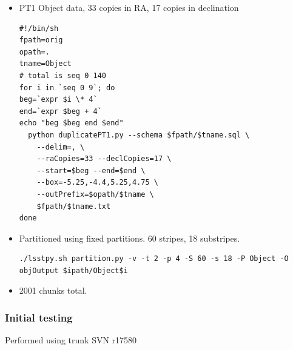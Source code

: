 \documentclass[DM,toc]{lsstdoc}
\begin{document}
\begin{itemize}
\item
  PT1 Object data, 33 copies in RA, 17 copies in declination

\begin{verbatim}
#!/bin/sh
fpath=orig
opath=.
tname=Object
# total is seq 0 140
for i in `seq 0 9`; do
beg=`expr $i \* 4`
end=`expr $beg + 4`
echo "beg $beg end $end"
  python duplicatePT1.py --schema $fpath/$tname.sql \
    --delim=, \
    --raCopies=33 --declCopies=17 \
    --start=$beg --end=$end \
    --box=-5.25,-4.4,5.25,4.75 \
    --outPrefix=$opath/$tname \
    $fpath/$tname.txt
done
\end{verbatim}

\item
  Partitioned using fixed partitions. 60 stripes, 18 substripes.

\begin{verbatim}
./lsstpy.sh partition.py -v -t 2 -p 4 -S 60 -s 18 -P Object -O objOutput $ipath/Object$i
\end{verbatim}

\item
  2001 chunks total.
\end{itemize}

\subsubsection{Initial testing}\label{initial-testing}

Performed using trunk SVN r17580
\end{document}
